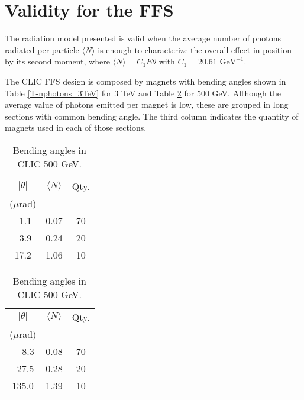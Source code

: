 \section{Validity for the FFS}
The radiation model presented is valid when the average number of photons radiated per particle $\langle N\rangle$ is enough to characterize the overall effect in position by its second moment, where $\langle N\rangle  = C_1E\theta$ with $C_1=20.61\text{ GeV}^{-1}$.\par
The CLIC FFS design is composed by magnets with bending angles shown in Table \ref{T-nphotons_3TeV} for 3 TeV and Table \ref{T-nphotons_500GeV} for 500 GeV. Although the average value of photons emitted per magnet is low, these are grouped in long sections with common bending angle. The third column indicates the quantity of magnets used in each of those sections.
\begin{table}[ht]
\begin{minipage}[b]{0.45\linewidth}\centering
\begin{tabular}{c|c|c}\hline\hline
 $|\theta|$ & $\langle N \rangle$&Qty.\\
 ($\mu$rad)&&\\\hline
 $\;\;$1.1& 0.07 &70 \\
 $\;\;$3.9& 0.24 &20 \\
 17.2& 1.06 &10\\\hline
\end{tabular}\caption{Bending angles in CLIC 3 TeV.}\label{T-nphotons_3TeV}
\end{minipage}
\hspace{0.5cm}
\begin{minipage}[b]{0.45\linewidth}
\centering
\begin{tabular}{c|c|c}\hline\hline
 $|\theta|$& $\langle N \rangle$&Qty.\\
 ($\mu$rad)&&\\\hline
 $\;\;\;\;$8.3& 0.08&70\\
 $\;\;$27.5& 0.28 &20\\
 135.0& 1.39 &10\\\hline
\end{tabular}\caption{Bending angles in CLIC 500 GeV.}\label{T-nphotons_500GeV}
\end{minipage}
\end{table}

